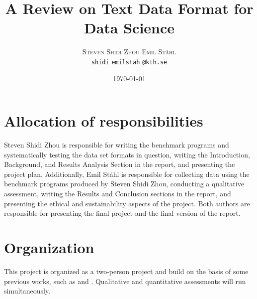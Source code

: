 \documentclass[12pt,twoside,english]{article}
\title{A Review on Text Data Format for Data Science}
\author{
        \textsc{Steven Shidi Zhou}
            \qquad
        \textsc{Emil Ståhl}
        \mbox{}\\
        \normalsize
            \texttt{shidi}
        \textbar{}
            \texttt{emilstah}
        \normalsize
            \texttt{@kth.se}
}
\date{\today}
\begin{document}
\maketitle





\section{Allocation of responsibilities}
\label{sect:alloc_responsibilities}
Steven Shidi Zhou is responsible for writing the benchmark programs and systematically testing the data set formats in question, writing the Introduction, Background, and Results Analysis Section in the report, and presenting the project plan. Additionally, Emil Ståhl is responsible for collecting data using the benchmark programs produced by Steven Shidi Zhou, conducting a qualitative assessment, writing the Results and Conclusion sections in the report, and presenting the ethical and sustainability aspects of the project. Both authors are responsible for presenting the final project and the final version of the report.


\section{Organization}
\label{sect:organization}
This project is organized as a two-person project and build on the basis of some previous works, such as \cite{plase_comparison_2017} and \cite{blomer_quantitative_2018}. Qualitative and quantitative assessments will run simultaneously.
\end{document}
